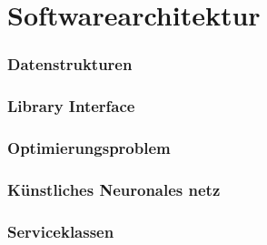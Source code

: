 \section{Softwarearchitektur}
\subsubsection{Datenstrukturen}
\subsubsection{Library Interface}
\subsubsection{Optimierungsproblem}
\subsubsection{Künstliches Neuronales netz}
\subsubsection{Serviceklassen}


